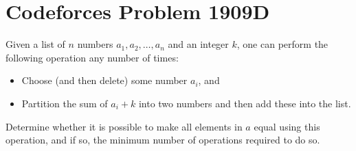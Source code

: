 \documentclass[a4paper, 12pt]{article}
\begin{document}
\section*{Codeforces Problem 1909D}

\begin{chirpbox}
    \begin{problem}
        Given a list of \( n \) numbers \( a_1, a_2, \ldots, a_n \) and an integer \( k \), one can perform the following operation any number of times:

        \begin{itemize}
            \item Choose (and then delete) some number \( a_i \), and
            \item Partition the sum of \( a_i + k \) into two numbers and then add these into the list.
        \end{itemize}
    \end{problem}
    Determine whether it is possible to make all elements in \( a \) equal using this operation, and if so, the minimum number of operations required to do so.
\end{chirpbox}
\end{document}
